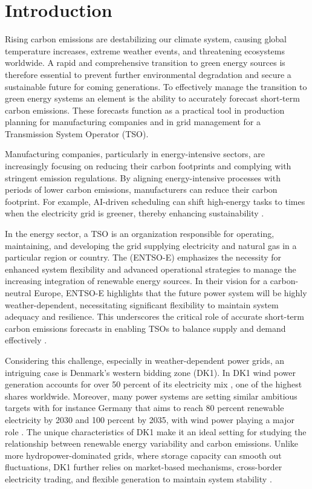 \thispagestyle{plain}
\section{Introduction}

Rising carbon emissions are destabilizing our climate system, causing global temperature increases, extreme weather events, and threatening ecosystems worldwide. A rapid and comprehensive transition to green energy sources is therefore essential to prevent further environmental degradation and secure a sustainable future for coming generations. To effectively manage the transition to green energy systems an element is the ability to accurately forecast short-term carbon emissions. These forecasts function as a practical tool in production planning for manufacturing companies and in grid management for a Transmission System Operator (TSO).

Manufacturing companies, particularly in energy-intensive sectors, are increasingly focusing on reducing their carbon footprints and complying with stringent emission regulations. By aligning energy-intensive processes with periods of lower carbon emissions, manufacturers can reduce their carbon footprint. For example, AI-driven scheduling can shift high-energy tasks to times when the electricity grid is greener, thereby enhancing sustainability \parencite{futurebridge}.

In the energy sector, a TSO is an organization responsible for operating, maintaining, and developing the grid supplying electricity and natural gas in a particular region or country. The \citeauthor{entsoe2022} (ENTSO-E) emphasizes the necessity for enhanced system flexibility and advanced operational strategies to manage the increasing integration of renewable energy sources. In their vision for a carbon-neutral Europe, ENTSO-E highlights that the future power system will be highly weather-dependent, necessitating significant flexibility to maintain system adequacy and resilience. This underscores the critical role of accurate short-term carbon emissions forecasts in enabling TSOs to balance supply and demand effectively \parencite{entsoe2022}.

Considering this challenge, especially in weather-dependent power grids, an intriguing case is Denmark's western bidding zone (DK1). In DK1 wind power generation accounts for over 50 percent of its electricity mix \parencite{wang2017,iea2023}, one of the highest shares worldwide. Moreover, many power systems are setting similar ambitious targets with for instance Germany that aims to reach 80 percent renewable electricity by 2030 and 100 percent by 2035, with wind power playing a major role \parencite{iea2025}. The unique characteristics of DK1 make it an ideal setting for studying the relationship between renewable energy variability and carbon emissions. Unlike more hydropower-dominated grids, where storage capacity can smooth out fluctuations, DK1 further relies on market-based mechanisms, cross-border electricity trading, and flexible generation to maintain system stability \parencite{energistyrelsen}.

